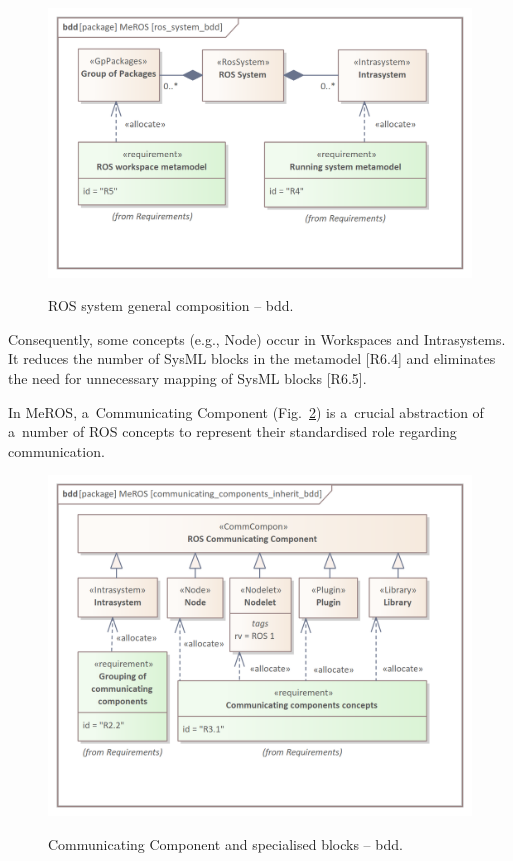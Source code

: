 \documentclass[11pt,oneside,a4paper]{article}
\begin{document}
		
	\begin{figure}[H]
		\centering
		\begin{center}
			{\includegraphics[scale=1.1]{img/meros_pkg/ros_system_bdd.png}}
		\end{center}
		\caption{ROS system general composition -- bdd.} 
		\label{fig:ros_system_bdd}
	\end{figure}
	
	Consequently, some concepts (e.g., Node) occur in Workspaces and Intrasystems. It reduces the number of SysML blocks in the metamodel [R6.4] and eliminates the need for unnecessary mapping of SysML blocks [R6.5].
		
	\pagebreak	
		
	In MeROS, a~Communicating Component (Fig.~\ref{fig:communicating_components_bdd}) is a~crucial abstraction of a~number of ROS concepts to represent their standardised role regarding communication. 
	
		
	\begin{figure}[H]
		\centering
		\begin{center}
			{\includegraphics[scale=1.1]{img/meros_pkg/communicating_components_inherit_bdd.png}}
		\end{center}
		\caption{Communicating Component and specialised blocks -- bdd.} 
		\label{fig:communicating_components_bdd}
	\end{figure}
	
\end{document}
